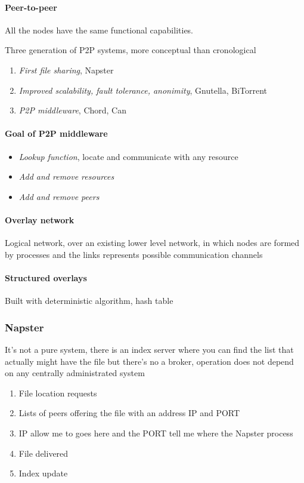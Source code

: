 \paragraph{Peer-to-peer} All the nodes have the same functional capabilities.

Three generation of P2P systems, more conceptual than cronological

\begin{enumerate}
    \item \textit{First file sharing}, Napster
    \item \textit{Improved scalability, fault tolerance, anonimity}, Gnutella, BiTorrent
    \item \textit{P2P middleware}, Chord, Can 
\end{enumerate}

\paragraph{Goal of P2P middleware}
\begin{itemize}
    \item \textit{Lookup function}, locate and communicate with any resource
    \item \textit{Add and remove resources}
    \item \textit{Add and remove peers}
\end{itemize}

\paragraph{Overlay network}
Logical network, over an existing lower level
network, in which nodes are formed by processes and the links represents possible communication channels

\paragraph{Structured overlays}
Built with deterministic algorithm, hash table 

\subsubsection{Napster}
It’s not a pure system, there is an index server where you can
find the list that actually might have the file but there’s no a broker, operation does not depend on any centrally administrated system
\begin{enumerate}
        \item File location requests
        \item Lists of peers offering the file with an address  IP and PORT
        \item IP allow me to goes here and the PORT tell me where the Napster process
        \item File delivered
        \item Index update
    \end{enumerate}

